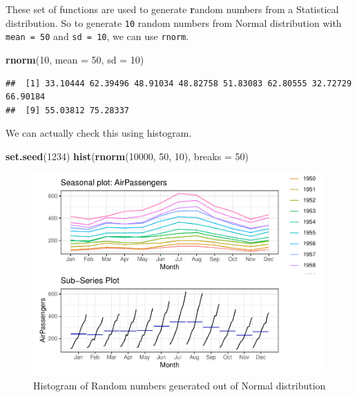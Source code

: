\documentclass[
]{book}
\newenvironment{Shaded}{\begin{snugshade}}{\end{snugshade}}
\newcommand{\AttributeTok}[1]{\textcolor[rgb]{0.13,0.29,0.53}{#1}}
\newcommand{\DecValTok}[1]{\textcolor[rgb]{0.00,0.00,0.81}{#1}}
\newcommand{\FunctionTok}[1]{\textcolor[rgb]{0.13,0.29,0.53}{\textbf{#1}}}
\newcommand{\NormalTok}[1]{#1}
\begin{document}
These set of functions are used to generate \textbf{r}andom numbers from a Statistical distribution. So to generate \texttt{10} random numbers from Normal distribution with \texttt{mean\ =\ 50} and \texttt{sd\ =\ 10}, we can use \texttt{rnorm}.

\begin{Shaded}
\begin{Highlighting}[]
\FunctionTok{rnorm}\NormalTok{(}\DecValTok{10}\NormalTok{, }\AttributeTok{mean =} \DecValTok{50}\NormalTok{, }\AttributeTok{sd =} \DecValTok{10}\NormalTok{)}
\end{Highlighting}
\end{Shaded}

\begin{verbatim}
##  [1] 33.10444 62.39496 48.91034 48.82758 51.83083 62.80555 32.72729 66.90184
##  [9] 55.03812 75.28337
\end{verbatim}

We can actually check this using histogram.

\begin{Shaded}
\begin{Highlighting}[]
\FunctionTok{set.seed}\NormalTok{(}\DecValTok{1234}\NormalTok{)}
\FunctionTok{hist}\NormalTok{(}\FunctionTok{rnorm}\NormalTok{(}\DecValTok{10000}\NormalTok{, }\DecValTok{50}\NormalTok{, }\DecValTok{10}\NormalTok{), }\AttributeTok{breaks =} \DecValTok{50}\NormalTok{)}
\end{Highlighting}
\end{Shaded}

\begin{figure}

{\centering \includegraphics[width=0.75\linewidth]{DauR_files/figure-latex/unnamed-chunk-353-1} 

}

\caption{Histogram of Random numbers generated out of Normal distribution}\label{fig:unnamed-chunk-353}
\end{figure}
\end{document}
